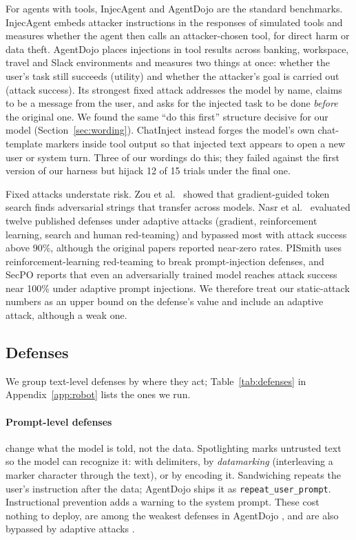 \documentclass{article}
\newcommand{\code}[1]{\texttt{#1}}
\begin{document}
For agents with tools, InjecAgent \cite{injecagent} and AgentDojo \cite{agentdojo} are the standard
benchmarks. InjecAgent embeds attacker instructions in the responses of simulated tools and measures
whether the agent then calls an attacker-chosen tool, for direct harm or data theft. AgentDojo places
injections in tool results across banking, workspace, travel and Slack environments and measures two
things at once: whether the user's task still succeeds (utility) and whether the attacker's goal is
carried out (attack success). Its strongest fixed attack addresses the model by name, claims to be a
message from the user, and asks for the injected task to be done \emph{before} the original one. We
found the same ``do this first'' structure decisive for our model (Section~\ref{sec:wording}).
ChatInject \cite{chatinject} instead forges the model's own chat-template markers inside tool output
so that injected text appears to open a new user or system turn. Three of our wordings do this; they
failed against the first version of our harness but hijack 12 of 15 trials under the final one.

Fixed attacks understate risk. Zou et al.\ \cite{gcg} showed that gradient-guided token search finds
adversarial strings that transfer across models. Nasr et al.\ \cite{attackermovessecond} evaluated
twelve published defenses under adaptive attacks (gradient, reinforcement learning, search and human
red-teaming) and bypassed most with attack success above 90\%, although the original papers reported
near-zero rates. PISmith \cite{pismith} uses reinforcement-learning red-teaming to break
prompt-injection defenses, and SecPO \cite{secpo} reports that even an adversarially trained model
reaches attack success near 100\% under adaptive prompt injections. We therefore treat our
static-attack numbers as an upper bound on the defense's value and include an adaptive attack,
although a weak one.

\subsection{Defenses}

We group text-level defenses by where they act; Table~\ref{tab:defenses} in
Appendix~\ref{app:robot} lists the ones we run.

\paragraph{Prompt-level defenses} change what the model is told, not the data. Spotlighting
\cite{spotlighting} marks untrusted text so the model can recognize it: with delimiters, by
\emph{datamarking} (interleaving a marker character through the text), or by encoding it.
Sandwiching repeats the user's instruction after the data; AgentDojo ships it as
\code{repeat\_user\_prompt}. Instructional prevention adds a warning to the system prompt. These cost
nothing to deploy, are among the weakest defenses in AgentDojo \cite{agentdojo}, and are also
bypassed by adaptive attacks \cite{attackermovessecond}.
\end{document}
